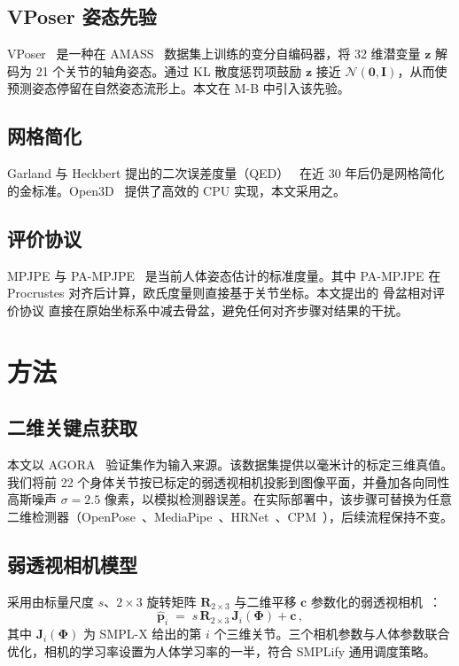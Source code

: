 \documentclass[a4paper,11pt]{article}
\newcommand{\prp}{骨盆相对评价协议}
\begin{document}
\subsection{VPoser 姿态先验}
VPoser~\cite{VPoser} 是一种在 AMASS~\cite{AMASS} 数据集上训练的变分自编码器，将 32 维潜变量 $\mathbf{z}$ 解码为 21 个关节的轴角姿态。通过 KL 散度惩罚项鼓励 $\mathbf{z}$ 接近 $\mathcal{N}(\mathbf{0},\mathbf{I})$，从而使预测姿态停留在自然姿态流形上。本文在 M-B 中引入该先验。

\subsection{网格简化}
Garland 与 Heckbert 提出的二次误差度量（QED）~\cite{QED} 在近 30 年后仍是网格简化的金标准。Open3D~\cite{Open3D} 提供了高效的 CPU 实现，本文采用之。

\subsection{评价协议}
MPJPE 与 PA-MPJPE~\cite{PAMpjpe} 是当前人体姿态估计的标准度量。其中 PA-MPJPE 在 Procrustes 对齐后计算，欧氏度量则直接基于关节坐标。本文提出的 \prp{} 直接在原始坐标系中减去骨盆，避免任何对齐步骤对结果的干扰。

\section{方法}
\label{sec:method}

\subsection{二维关键点获取}
本文以 AGORA~\cite{AGORA} 验证集作为输入来源。该数据集提供以毫米计的标定三维真值。我们将前 22 个身体关节按已标定的弱透视相机投影到图像平面，并叠加各向同性高斯噪声 $\sigma=2.5$ 像素，以模拟检测器误差。在实际部署中，该步骤可替换为任意二维检测器（OpenPose~\cite{OpenPose}、MediaPipe~\cite{Mediapipe}、HRNet~\cite{HRNet}、CPM~\cite{CPM}），后续流程保持不变。

\subsection{弱透视相机模型}
采用由标量尺度 $s$、$2\times 3$ 旋转矩阵 $\mathbf{R}_{2\times 3}$ 与二维平移 $\mathbf{c}$ 参数化的弱透视相机~\cite{weakpersp}：
\begin{equation}
\hat{\mathbf{p}}_i \;=\; s\,\mathbf{R}_{2\times 3}\,\mathbf{J}_i(\boldsymbol{\Phi}) + \mathbf{c}\,,
\end{equation}
其中 $\mathbf{J}_i(\boldsymbol{\Phi})$ 为 SMPL-X 给出的第 $i$ 个三维关节。三个相机参数与人体参数联合优化，相机的学习率设置为人体学习率的一半，符合 SMPLify 通用调度策略。
\end{document}
